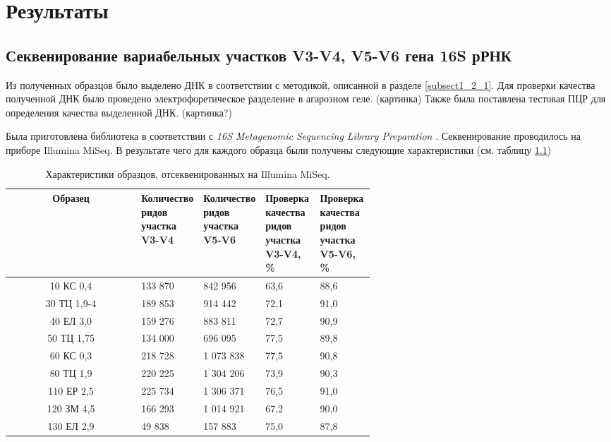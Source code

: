\chapter{Результаты} \label{chapt2}

\section{Секвенирование вариабельных участков V3-V4, V5-V6 гена 16S рРНК} \label{sect2_1}


Из полученных образцов было выделено ДНК в соответствии с методикой, описанной в разделе \ref{subsect1_2_1}. Для проверки качества полученной ДНК было проведено электрофоретическое разделение в агарозном геле. (картинка) Также была поставлена тестовая ПЦР для определения качества выделенной ДНК. (картинка?) 

Была приготовлена библиотека в соответствии с \textit{16S Metagenomic Sequencing Library Preparation }. Секвенирование проводилось на приборе Illumina MiSeq. В результате чего для каждого образца были получены следующие характеристики (см. таблицу \ref{tab:16Sread_Ill_characteristic})

\begin{table}[h]
\caption{Характеристики образцов, отсеквенированных на Illumina MiSeq.}\label{tab:16Sread_Ill_characteristic}
\begin{center}
\begin{tabular}{|c|p{0.15\linewidth}|p{0.15\linewidth}|p{0.15\linewidth}|p{0.15\linewidth}|}
\hline
Образец & Количество ридов участка V3-V4 & Количество ридов участка V5-V6 & Проверка качества ридов участка V3-V4, \% & Проверка качества ридов участка V5-V6, \% \\
\hline
10 КС 0,4 &                                                                                                                                                                                                                                                                                                                                                                                                                                                                                                                                                                        133 870 & 842 956 & 63,6 & 88,6  \\
30 ТЦ 1,9-4 & 189 853 & 914 442 & 72,1  & 91,0  \\
40 ЕЛ 3,0 & 159 276 & 883 811 & 72,7  & 90,9  \\
50 ТЦ 1,75 & 134 000 & 696 095 & 77,5  & 89,8  \\
60 КС 0,3 & 218 728 & 1 073 838 & 77,5  & 90,8  \\
80 ТЦ 1,9 & 220 225 & 1 304 206 & 73,9  & 90,3  \\
110 ЕР 2,5 & 225 734 & 1 306 371 & 76,5  & 91,0  \\
120 ЗМ 4,5 & 166 293 & 1 014 921 & 67,2  & 90,0  \\
130 ЕЛ 2,9 & 49 838 & 157 883 & 75,0  & 87,8  \\
\hline
\end{tabular}
\end{center}
\end{table}

